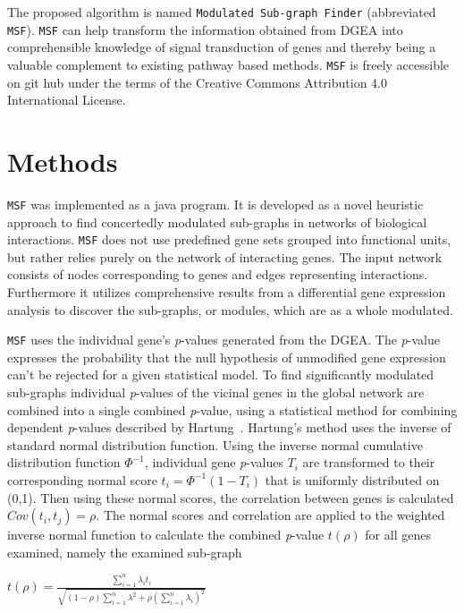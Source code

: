 \documentclass[10pt,a4paper,twocolumn]{article}
\begin{document}
	The proposed algorithm is named
	\texttt{Modulated Sub-graph Finder} (abbreviated
	\texttt{MSF}). \texttt{MSF} can help transform the information obtained
	from DGEA into comprehensible knowledge of signal transduction of genes and
	thereby being a valuable complement to existing pathway based
	methods. \texttt{MSF} is freely accessible on git hub under the terms of the
	Creative Commons Attribution 4.0 International License.
	
	
	\section*{Methods}
	
	\texttt{MSF} was implemented as a java program. It is developed as a novel heuristic approach to find concertedly
	modulated sub-graphs in networks of biological interactions. \texttt{MSF}
	does not use predefined gene sets grouped into functional units, but rather
	relies purely on the network of interacting genes. The input network
	consists of nodes corresponding to genes and edges representing
	interactions. Furthermore it utilizes comprehensive results from a
	differential gene expression analysis to discover the sub-graphs, or
	modules, which are as a whole modulated.
	
	\texttt{MSF} uses the individual gene's \textit{p}-values generated from
	the DGEA. The \textit{p}-value expresses the probability that the null
	hypothesis of unmodified gene expression can't be rejected for a given
	statistical model. To find significantly modulated sub-graphs individual
	\textit{p}-values of the vicinal genes in the global network are combined
	into a single combined \textit{p}-value, using a statistical method for
	combining dependent \textit{p}-values described by
	Hartung~\cite{Hartung}. Hartung's method uses the inverse of standard
	normal distribution function. Using the inverse normal cumulative distribution function $\Phi^{-1}$, individual gene \textit{p}-values $T_{i}$ are 
	transformed to their corresponding normal score $t_{i}=\Phi^{-1}(1-T_{i})$ that is uniformly distributed on (0,1). Then using these normal
	scores, the correlation between genes is calculated $Cov(t_{i},t_{j})=\rho$. The normal scores and
	correlation are applied to the weighted inverse normal function to calculate the
	combined \textit{p}-value $t(\rho)$ for all genes examined, namely the examined
	sub-graph
	\newline
	\begin{center}
		$t(\rho)=\frac{\sum_{i=1}^{n}\lambda_i t_{i} }{\sqrt{(1-\rho) \sum_{i=1}^{n} \lambda^{2}+\rho(\sum_{i=1}^{n} \lambda_i)^{2}}}$
	\end{center}
	
\end{document}
